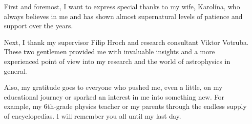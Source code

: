 First and foremost, I want to express special thanks to my wife, Karolína, who always believes in me and has shown almost supernatural levels of patience and support over the years. 

Next, I thank my supervisor Filip Hroch and research consultant Viktor Votruba. These two gentlemen provided me with invaluable insights and a more experienced point of view into my research and the world of astrophysics in general. 

Also, my gratitude goes to everyone who pushed me, even a little, on my educational journey or sparked an interest in me into something new. For example, my 6th-grade physics teacher or my parents through the endless supply of encyclopedias. I will remember you all until my last day.
